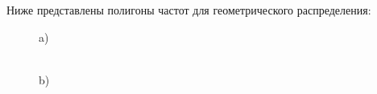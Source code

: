 \documentclass[a4paper,12pt, oneside]{book}
\begin{document}
Ниже представлены полигоны частот для геометрического распределения:\\
\begin{figure}[h!]
	\begin{center}
		\begin{minipage}[h!]{0.47\linewidth}
			 a) \\
		\end{minipage}
		\hfill
		\begin{minipage}[h!]{0.47\linewidth}
			 \\b)
		\end{minipage}
		\vfill
		\begin{minipage}[h!]{0.47\linewidth}

\end{minipage}
\end{center}
\end{figure}
\end{document}
